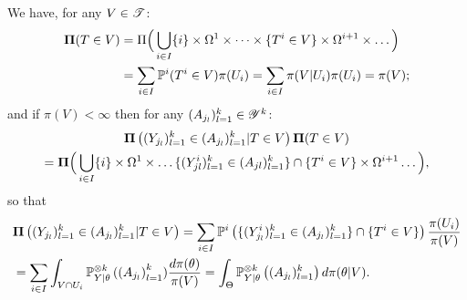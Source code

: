 We have,
for any $V\in\mathscr{T}$:
    \begin{align}
          \mathbf{\Pi}(T\in V) &= \Pi\Big(\bigcup_{i\in I}\{i\}\times\Omega^1\times\dots\times\{T^i\in V\}\times\Omega^{i+1}\times\dots\Big)\\
          &=\sum_{i\in I}\mathbb{P}^i(T^i\in V)\pi(U_i) = \sum_{i\in I}\pi(V|U_i)\pi(U_i) = \pi(V);\nonumber
    \end{align}
and if $\pi(V)<\infty$ then for any $(A_{j_l})_{l=1}^k\in\mathscr{Y}^k$: %
    \begin{multline}
        \mathbf{\Pi}\left((Y_{j_l})_{l=1}^k\in(A_{j_l})_{l=1}^k|T\in V\right)\mathbf{\Pi}(T\in V) \\ = 
        \mathbf{\Pi}\Big(\bigcup_{i\in I}  \{i\}\times\Omega^1\times\dots\{(Y^i_{jl})_{l=1}^k\in(A_{jl})_{l=1}^k\}\cap \{T^i\in V \}\times\Omega^{i+1}\dots 
        \Big),
    \end{multline}
    so that
        \begin{align}\nonumber
        &\mathbf{\Pi}\left((Y_{j_l})_{l=1}^k\in(A_{j_l})_{l=1}^k|T\in V\right) 
            = \sum_{i\in I}\mathbb{P}^i\left( \{(Y_{j_l}^i)_{l=1}^k\in(A_{j_l})_{l=1}^k\}\cap \{T^i\in V\}\right)\frac{\pi(U_i)}{\pi(V)} \\
            &= \sum_{i\in I}\int_{V\cap U_i}\mathbb{P}^{\otimes k}_{Y|\theta}\left((A_{j_l}\right)_{l=1}^k)\frac{d\pi(\theta)}{\pi(V)}  = \int_\Theta\mathbb{P}^{\otimes k}_{Y|\theta}\left((A_{j_l})_{l=1}^k\right)d\pi(\theta|V).
    \end{align}



